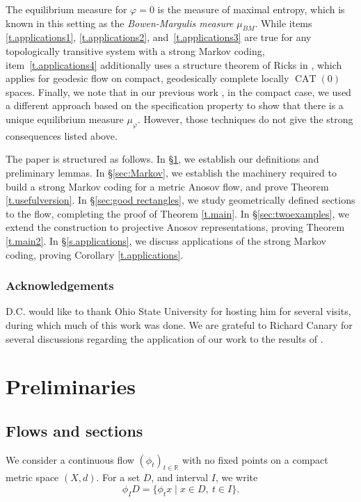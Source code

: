 \documentclass[JEP,XML,SOM,Unicode,NoFloatCountersInSection]{cedram}
\let\sep\mid
\theoremstyle{definition}
\numberwithin{equation}{section}
\DeclareMathOperator{\CAT}{CAT}
\begin{document}
The equilibrium measure for $\varphi=0$ is the measure of maximal entropy, which is known in this setting as the \emph{Bowen-Margulis measure} $\mu_{BM}$. While items \eqref{t.applications1}, \eqref{t.applications2}, and~\eqref{t.applications3} are true for any topologically transitive system with a strong Markov coding, item~\eqref{t.applications4} additionally uses a structure theorem of Ricks in \cite{ricks}, which applies for geodesic flow on compact, geodesically complete locally $\CAT(0)$ spaces. Finally, we note that in our previous work \cite{CLT}, in the compact case, we used a different approach based on the specification property to show that there is a unique equilibrium measure $\mu_\varphi$. However, those techniques do not give the strong consequences listed above.

The paper is structured as follows. In \S \ref{sec:background}, we establish our definitions and preliminary lemmas. In \S \ref{sec:Markov}, we establish the machinery required to build a strong Markov coding for a metric Anosov flow, and prove Theorem \ref{t.usefulversion}. In \S\ref{sec:good rectangles}, we study geometrically defined sections to the flow, completing the proof of Theorem \ref{t.main}. In \S \ref{sec:twoexamples}, we extend the construction to projective Anosov representations, proving Theorem \ref{t.main2}. In \S \ref{s.applications}, we discuss applications of the strong Markov coding, proving Corollary \ref{t.applications}.

\subsubsection*{Acknowledgements}
D.C. would like to thank Ohio State University for hosting him for several visits, during which much of this work was done. We are grateful to Richard Canary for several discussions regarding the application of our work to the results of \cite{bcls}.

\section{Preliminaries}\label{sec:background}

\subsection{Flows and sections}

We consider a continuous flow $(\phi_t)_{t \in \mathbb R}$ with no fixed points on a compact metric space $(X, d)$. For a set $D$, and interval $I$, we write
\[ \phi_I D = \{\phi_t x \sep x \in D, \ t \in I\}. \]
\end{document}
